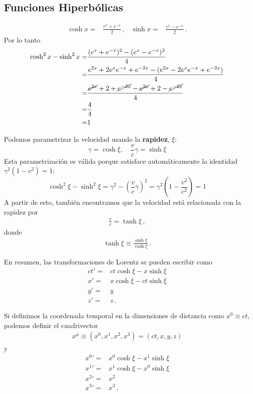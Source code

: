 \documentclass[11pt,a4paper]{article}
\begin{document}
\

\subsection{Funciones Hiperbólicas}
\begin{align*}
    \cosh x =& \frac{{e}^{x}+{e}^{-x}}{2}\,,&
\sinh x =& \frac{{e}^{x}-{e}^{-x}}{2}\,.
\end{align*}
Por lo tanto
\begin{align*}
    \cosh^2x - \sinh^2x =& \frac{({e}^{x}+{e}^{-x})^2
    -({e}^{x}-{e}^{-x})^2}{4}\\
    =&\frac{{e}^{2x}+2{e}^{x}{e}^{-x}+{e}^{-2x}
-({e}^{2x}-2{e}^{x}{e}^{-x}+{e}^{-2x})}{4}\\
=&\frac{\cancel{{e}^{2x}}+2+\cancel{{e}^{-2x}}
-\cancel{{e}^{2x}}+2-\cancel{{e}^{-2x}}}{4}\\
=&\frac{4}{4}\\
=&1
\end{align*}

Podemos parametrizar la velocidad usando la \textbf{rapidez}, $\xi$:
\[ \gamma = \cosh\xi, \quad \frac{v}{c}\gamma = \sinh\xi \]
Esta parametrización es válida porque satisface automáticamente la identidad $\gamma^2(1-v^2)=1$:
\[ \cosh^2\xi - \sinh^2\xi = \gamma^2 - \left(\frac{v}{c}\gamma\right)^2 = \gamma^2\left(1-\frac{v^2}{c^2}\right) = 1 \]
A partir de esto, también encontramos que la velocidad está relacionada con la rapidez por 
\begin{align*}
    \frac{v}{c} = \tanh\xi\,,
\end{align*}
donde
\begin{align*}
\tanh\xi \equiv \frac{\sinh\xi}{\cosh\xi}\,.    
\end{align*}

En resumen, las transformaciones de Lorentz se pueden escribir como
\[
\boxed{
\begin{aligned}    
    ct' =& ct\cosh\xi - x\sinh\xi \\
    x' = &x\cosh\xi -ct\sinh\xi\\
    y' = & y\\
    z' = &z\,.
\end{aligned}
}
\]

Si definimos la coordenada temporal en la dimensiones de distancia como $x^0\equiv ct$, podemos definir el cuadrivector
\begin{align}
    x^\mu \equiv \left(x^0, x^1, x^2,x^3 \right) = \left(ct, x, y,z \right)
\end{align}
y
\[
\boxed{
\begin{aligned}    
    {x^0}' =& x^0\cosh\xi - x^1\sinh\xi \\
    {x^1}' = &x^1\cosh\xi -x^0\sinh\xi\\
    {x^2}' = & x^2\\
    {x^3}' = &x^3\,.
\end{aligned}
}
\]
\end{document}
